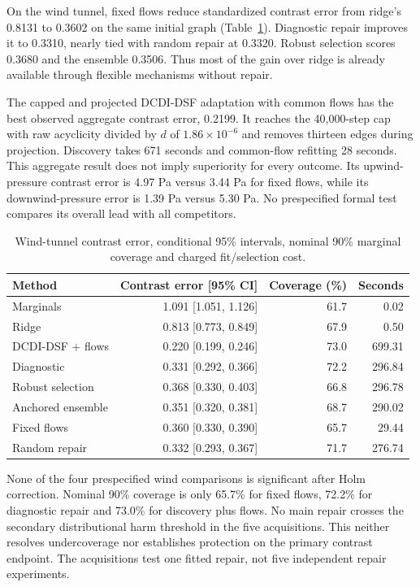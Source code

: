 \documentclass{svproc}
\begin{document}
On the wind tunnel, fixed flows reduce standardized contrast error from ridge's
0.8131 to 0.3602 on the same initial graph (Table~\ref{tab:wind}). Diagnostic
repair improves it to 0.3310, nearly tied with random repair at 0.3320. Robust
selection scores 0.3680 and the ensemble 0.3506. Thus most of the gain over
ridge is already available through flexible mechanisms without repair.

The capped and projected DCDI-DSF adaptation with common flows has the best
observed aggregate contrast error, 0.2199. It reaches the 40,000-step cap with
raw acyclicity divided by $d$ of $1.86\times10^{-6}$ and removes thirteen edges
during projection. Discovery takes 671 seconds and common-flow refitting 28
seconds. This aggregate result does not imply superiority for every outcome.
Its upwind-pressure contrast error is 4.97 Pa versus 3.44 Pa for fixed flows,
while its downwind-pressure error is 1.39 Pa versus 5.30 Pa. No prespecified
formal test compares its overall lead with all competitors.

\begin{table}[!htb]
\setlength{\tabcolsep}{4pt}
\caption{Wind-tunnel contrast error, conditional 95\% intervals, nominal 90\% marginal coverage and charged fit/selection cost.}
\label{tab:wind}
\centering
\begin{tabular}{@{}lrrr@{}}
\toprule
Method & Contrast error [95\% CI] & Coverage (\%) & Seconds\\
\midrule
Marginals & 1.091 [1.051, 1.126] & 61.7 & 0.02 \\
Ridge & 0.813 [0.773, 0.849] & 67.9 & 0.50 \\
DCDI-DSF + flows & 0.220 [0.199, 0.246] & 73.0 & 699.31 \\
Diagnostic & 0.331 [0.292, 0.366] & 72.2 & 296.84 \\
Robust selection & 0.368 [0.330, 0.403] & 66.8 & 296.78 \\
Anchored ensemble & 0.351 [0.320, 0.381] & 68.7 & 290.02 \\
Fixed flows & 0.360 [0.330, 0.390] & 65.7 & 29.44 \\
Random repair & 0.332 [0.293, 0.367] & 71.7 & 276.74 \\
\bottomrule
\end{tabular}
\end{table}

None of the four prespecified wind comparisons is significant after Holm
correction. Nominal 90\% coverage is only 65.7\% for fixed flows, 72.2\% for
diagnostic repair and 73.0\% for discovery plus flows. No main repair crosses
the secondary distributional harm threshold in the five acquisitions. This
neither resolves undercoverage nor establishes protection on the primary
contrast endpoint. The acquisitions test one fitted repair, not five independent
repair experiments.
\end{document}
